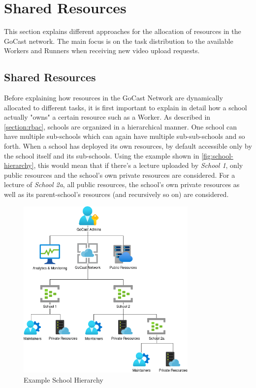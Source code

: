 \section{Shared Resources}\label{section:shared-resources}

This section explains different approaches for the allocation of resources in the GoCast network. The main focus is on the task distribution to the available Workers and Runners when receiving new video upload requests.

\subsection{Shared Resources}

Before explaining how resources in the GoCast Network are dynamically allocated to different tasks, it is first important to explain in detail how a school actually "owns" a certain resource such as a Worker. As described in \autoref{section:rbac}, schools are organized in a hierarchical manner. One school can have multiple sub-schools which can again have multiple sub-sub-schools and so forth. When a school has deployed its own resources, by default accessible only by the school itself and its sub-schools. Using the example shown in \autoref{fig:school-hierarchy}, this would mean that if there's a lecture uploaded by \textit{School 1}, only public resources and the school's own private resources are considered. For a lecture of \textit{School 2a}, all public resources, the school's own private resources as well as its parent-school's resources (and recursively so on) are considered. 

\begin{figure}[htpb]
    \centering
    \includegraphics[width=250pt]{images/SchoolHierarchy.png}
    \caption[Example School Hierarchy]{Example School Hierarchy}\label{fig:school-hierarchy}
\end{figure}

